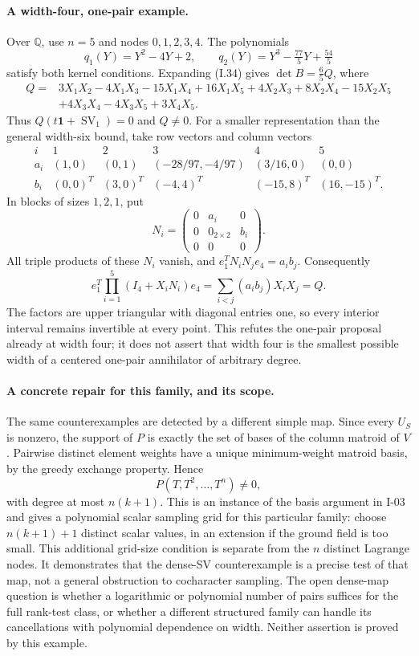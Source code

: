 \documentclass[11pt,a4paper]{article}
\theoremstyle{definition}\newtheorem{definition}{Definition}
\begin{document}
\paragraph{A width-four, one-pair example.}
Over $\mathbb Q$, use $n=5$ and nodes $0,1,2,3,4$.
The polynomials
\[
 q_1(Y)=Y^2-4Y+2,\qquad
 q_2(Y)=Y^3-\tfrac{77}{5}Y+\tfrac{54}{5}
\]
satisfy both kernel conditions.  Expanding (I.34) gives
$\det B=\frac65 Q$, where
\[
\begin{split}
 Q={}&3X_1X_2-4X_1X_3-15X_1X_4+16X_1X_5
       +4X_2X_3+8X_2X_4-15X_2X_5\\
    &+4X_3X_4-4X_3X_5+3X_4X_5.
\end{split}
\tag{I.35}
\]
Thus $Q(t\mathbf1+\operatorname{SV}_1)=0$ and $Q\ne0$.
For a smaller representation than the general width-six bound,
take row vectors and column vectors
\[
\begin{array}{c|ccccc}
i&1&2&3&4&5\\ \hline
a_i&(1,0)&(0,1)&(-28/97,-4/97)&(3/16,0)&(0,0)\\
b_i&(0,0)^T&(3,0)^T&(-4,4)^T&(-15,8)^T&(16,-15)^T.
\end{array}
\]
In blocks of sizes $1,2,1$, put
\[
 N_i=\begin{pmatrix}0&a_i&0\\0&0_{2\times2}&b_i\\0&0&0\end{pmatrix}.
\]
All triple products of these $N_i$ vanish, and
$e_1^TN_iN_je_4=a_i b_j$.
Consequently
\[
 e_1^T\prod_{i=1}^5(I_4+X_iN_i)e_4
      =\sum_{i<j}(a_ib_j)X_iX_j=Q.
\]
The factors are upper triangular with diagonal entries one,
so every interior interval remains invertible at every point.
This refutes the one-pair proposal already at width four;
it does not assert that width four is the smallest possible
width of a centered one-pair annihilator of arbitrary degree.

\paragraph{A concrete repair for this family, and its scope.}
The same counterexamples are detected by a different simple
map.  Since every $U_S$ is nonzero, the support of $P$ is
exactly the set of bases of the column matroid of $V$.
Pairwise distinct element weights have a unique minimum-weight
matroid basis, by the greedy exchange property.  Hence
\[
 P(T,T^2,\ldots,T^n)\ne0,
\]
with degree at most $n(k+1)$.
This is an instance of the basis argument in I-03 and gives a
polynomial scalar sampling grid for this particular family:
choose $n(k+1)+1$ distinct scalar values, in an extension if
the ground field is too small.  This additional grid-size
condition is separate from the $n$ distinct Lagrange nodes.
It demonstrates that the dense-SV counterexample is a precise
test of that map, not a general obstruction to cocharacter
sampling.  The open dense-map question is whether a
logarithmic or polynomial number of pairs suffices for the
full rank-test class, or whether a different structured family
can handle its cancellations with polynomial dependence on
width.  Neither assertion is proved by this example.
\end{document}

